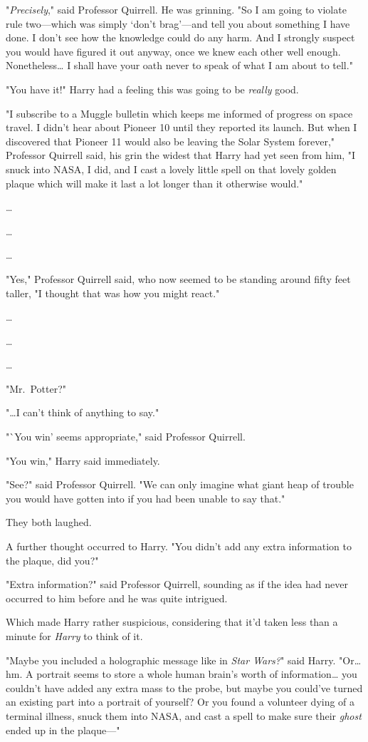 "\emph{Precisely}," said Professor Quirrell. He was grinning. "So I am going to 
violate rule two---which was simply `don't brag'---and tell you about something 
I have done. I don't see how the knowledge could do any harm. And I strongly 
suspect you would have figured it out anyway, once we knew each other well 
enough. Nonetheless{\ldots} I shall have your oath never to speak of what I am 
about to tell."

"You have it!" Harry had a feeling this was going to be \emph{really} good.

"I subscribe to a Muggle bulletin which keeps me informed of progress on space 
travel. I didn't hear about Pioneer 10 until they reported its launch. But when 
I discovered that Pioneer 11 would also be leaving the Solar System forever," 
Professor Quirrell said, his grin the widest that Harry had yet seen from him, 
"I snuck into NASA, I did, and I cast a lovely little spell on that lovely 
golden plaque which will make it last a lot longer than it otherwise would."

{\ldots}

{\ldots}

{\ldots}

"Yes," Professor Quirrell said, who now seemed to be standing around fifty feet 
taller, "I thought that was how you might react."

{\ldots}

{\ldots}

{\ldots}

"Mr.~Potter?"

"{\ldots}I can't think of anything to say."

"`You win' seems appropriate," said Professor Quirrell.

"You win," Harry said immediately.

"See?" said Professor Quirrell. "We can only imagine what giant heap of trouble 
you would have gotten into if you had been unable to say that."

They both laughed.

A further thought occurred to Harry. "You didn't add any extra information to 
the plaque, did you?"

"Extra information?" said Professor Quirrell, sounding as if the idea had never 
occurred to him before and he was quite intrigued.

Which made Harry rather suspicious, considering that it'd taken less than a 
minute for \emph{Harry} to think of it.

"Maybe you included a holographic message like in \emph{Star Wars?}" said 
Harry. "Or{\ldots} hm. A portrait seems to store a whole human brain's worth of 
information{\ldots} you couldn't have added any extra mass to the probe, but 
maybe you could've turned an existing part into a portrait of yourself? Or you 
found a volunteer dying of a terminal illness, snuck them into NASA, and cast a 
spell to make sure their \emph{ghost} ended up in the plaque---"

